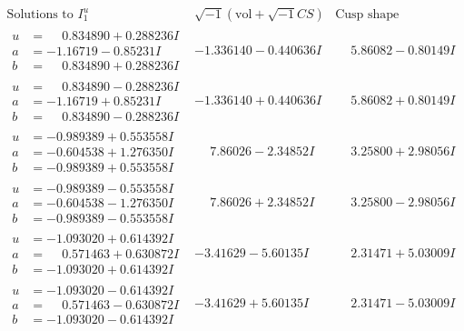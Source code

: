 \documentclass[1p]{elsarticle_modified}
\theoremstyle{definition}
\newcommand{\I}{\sqrt{-1}}
\begin{document}
$$\begin{array}{c|c|c}  
\text{Solutions to }I^u_{1}& \I (\text{vol} + \sqrt{-1}CS) & \text{Cusp shape}\\
 \hline 
\begin{aligned}
u &= \phantom{-}0.834890 + 0.288236 I \\
a &= -1.16719 - 0.85231 I \\
b &= \phantom{-}0.834890 + 0.288236 I\end{aligned}
 & -1.336140 - 0.440636 I & \phantom{-}5.86082 - 0.80149 I \\ \hline\begin{aligned}
u &= \phantom{-}0.834890 - 0.288236 I \\
a &= -1.16719 + 0.85231 I \\
b &= \phantom{-}0.834890 - 0.288236 I\end{aligned}
 & -1.336140 + 0.440636 I & \phantom{-}5.86082 + 0.80149 I \\ \hline\begin{aligned}
u &= -0.989389 + 0.553558 I \\
a &= -0.604538 + 1.276350 I \\
b &= -0.989389 + 0.553558 I\end{aligned}
 & \phantom{-}7.86026 - 2.34852 I & \phantom{-}3.25800 + 2.98056 I \\ \hline\begin{aligned}
u &= -0.989389 - 0.553558 I \\
a &= -0.604538 - 1.276350 I \\
b &= -0.989389 - 0.553558 I\end{aligned}
 & \phantom{-}7.86026 + 2.34852 I & \phantom{-}3.25800 - 2.98056 I \\ \hline\begin{aligned}
u &= -1.093020 + 0.614392 I \\
a &= \phantom{-}0.571463 + 0.630872 I \\
b &= -1.093020 + 0.614392 I\end{aligned}
 & -3.41629 - 5.60135 I & \phantom{-}2.31471 + 5.03009 I \\ \hline\begin{aligned}
u &= -1.093020 - 0.614392 I \\
a &= \phantom{-}0.571463 - 0.630872 I \\
b &= -1.093020 - 0.614392 I\end{aligned}
 & -3.41629 + 5.60135 I & \phantom{-}2.31471 - 5.03009 I \\ \hline\begin{aligned}

\end{aligned}
\end{array}$$
\end{document}

